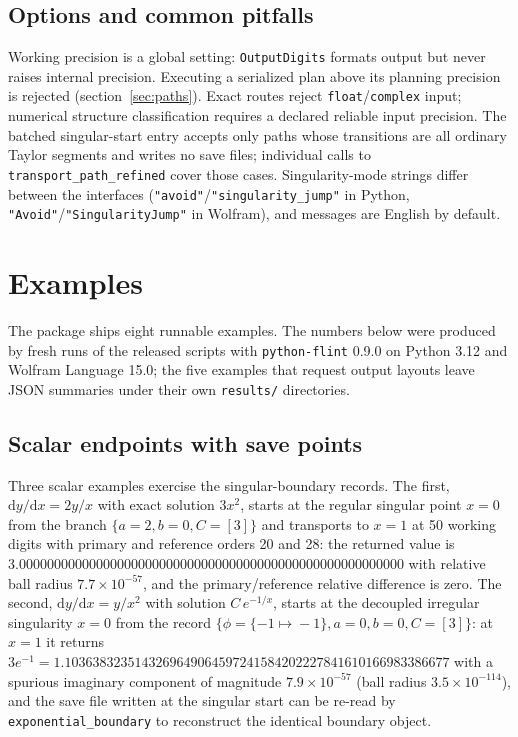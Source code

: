 \documentclass[11pt,a4paper]{article}
\newcommand{\dd}{\mathrm d}
\begin{document}
\subsection{Options and common pitfalls}
\label{sec:pitfalls}

Working precision is a global setting: \texttt{OutputDigits} formats output but never
raises internal precision. Executing a serialized plan above its planning precision is
rejected (section~\ref{sec:paths}). Exact routes reject
\texttt{float}/\texttt{complex} input; numerical structure classification requires a
declared reliable input precision. The batched singular-start entry accepts only paths
whose transitions are all ordinary Taylor segments and writes no save files; individual
calls to \texttt{transport\_path\_refined} cover those cases. Singularity-mode strings
differ between the interfaces (\texttt{"avoid"}/\texttt{"singularity\_jump"} in Python,
\texttt{"Avoid"}/\texttt{"SingularityJump"} in Wolfram), and messages are English by
default.

\section{Examples}
\label{sec:examples}

The package ships eight runnable examples. The numbers below were produced by fresh runs
of the released scripts with \texttt{python-flint} 0.9.0 on Python 3.12 and Wolfram
Language 15.0; the five examples that request output layouts leave JSON summaries under
their own \texttt{results/} directories.

\subsection{Scalar endpoints with save points}
\label{sec:example-saves}

Three scalar examples exercise the singular-boundary records.
The first, $\dd y/\dd x=2y/x$ with exact solution $3x^2$, starts at the regular singular
point $x=0$ from the branch $\{a{=}2,b{=}0,C{=}[3]\}$ and transports to $x=1$ at 50
working digits with primary and reference orders 20 and 28: the returned value is
$3.0000000000000000000000000000000000000000000000000000000$ with relative ball radius
$7.7\times10^{-57}$, and the primary/reference relative difference is zero. The second,
$\dd y/\dd x=y/x^{2}$ with solution $C\,e^{-1/x}$, starts at the decoupled irregular
singularity $x=0$ from the record $\{\phi{=}\{-1\!\mapsto\!-1\},a{=}0,b{=}0,C{=}[3]\}$:
at $x=1$ it returns
$3e^{-1}=1.1036383235143269649064597241584202227841610166983386677$ with a spurious
imaginary component of magnitude $7.9\times10^{-57}$ (ball radius $3.5\times10^{-114}$),
and the save file written at the singular
start can be re-read by \texttt{exponential\_boundary} to reconstruct the identical
boundary object.
\end{document}
